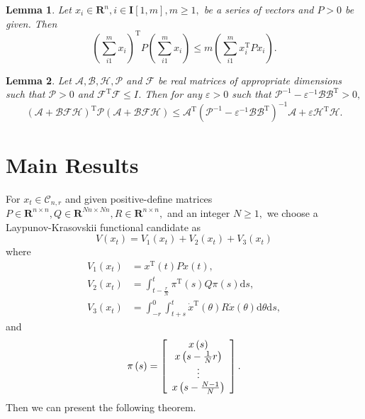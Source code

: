 \documentclass[9pt]{article}%
\newtheorem{lemma}{Lemma}
\begin{document}
\begin{lemma}
\label{lemma3}Let $x_{i}\in \mathbf{R}^{n},i\in \mathbf{I}\left[  1,m\right]
,m\geq1,$ be a series of vectors and $P>0$ be given. Then%
\begin{equation}
\left(  \underset{i1}{\overset{m}{\sum}}x_{i}\right)  ^{\mathrm{T}}P\left(
\underset{i1}{\overset{m}{\sum}}x_{i}\right)  \leq m\left(  \underset
{i1}{\overset{m}{\sum}}x_{i}^{\mathrm{T}}Px_{i}\right)  . \label{eq27}%
\end{equation}

\end{lemma}

\begin{lemma}
\label{lemma4}Let $\mathcal{A},\mathcal{B},\mathcal{H},\mathcal{P}$ and
$\mathcal{F}$ be real matrices of appropriate dimensions such that
$\mathcal{P}>0$ and $\mathcal{F}^{\mathrm{T}}\mathcal{F}\leq I$. Then for any
$\varepsilon>0$ such that $\mathcal{P}^{-1}-\varepsilon^{-1}\mathcal{BB}%
^{\mathrm{T}}>0,$%
\begin{equation}
\left(  \mathcal{A+BFH}\right)  ^{\mathrm{T}}\mathcal{P}\left(
\mathcal{A+BFH}\right)  \leq \mathcal{A}^{\mathrm{T}}\left(  \mathcal{P}%
^{-1}-\varepsilon^{-1}\mathcal{BB}^{\mathrm{T}}\right)  ^{-1}\mathcal{A+}%
\varepsilon \mathcal{H}^{\mathrm{T}}\mathcal{H}\text{.} \label{eq18}%
\end{equation}

\end{lemma}

\section{Main Results}

For $x_{t}\in \mathcal{C}_{n,r}$ and given positive-define matrices
$P\in \mathbf{R}^{n\times n},Q\in \mathbf{R}^{Nn\times Nn},R\in \mathbf{R}%
^{n\times n},$ and an integer $N\geq1,$ we choose a Laypunov-Krasovskii
functional candidate as%
\begin{equation}
V\left(  x_{t}\right)  =V_{1}\left(  x_{t}\right)  +V_{2}\left(  x_{t}\right)
+V_{3}\left(  x_{t}\right)  \label{eq8}%
\end{equation}
where%
\begin{align*}
V_{1}\left(  x_{t}\right)   &  =x^{\mathrm{T}}\left(  t\right)  Px\left(
t\right)  ,\\
V_{2}\left(  x_{t}\right)   &  =\int_{t-\frac{r}{N}}^{t}\pi^{\mathrm{T}%
}\left(  s\right)  Q\pi \left(  s\right)  \mathrm{d}s,\\
V_{3}\left(  x_{t}\right)   &  =\int_{-r}^{0}\int_{t+s}^{t}\dot{x}%
^{\mathrm{T}}\left(  \theta \right)  R\dot{x}\left(  \theta \right)
\mathrm{d}\theta \mathrm{d}s,
\end{align*}
and%
\[
\pi \left(  s\right)  =\left[
\begin{array}
[c]{c}%
x\left(  s\right) \\
x\left(  s-\frac{1}{N}r\right) \\
\vdots \\
x\left(  s-\frac{N-1}{N}\right)
\end{array}
\right]  .
\]
Then we can present the following theorem.
\end{document}

